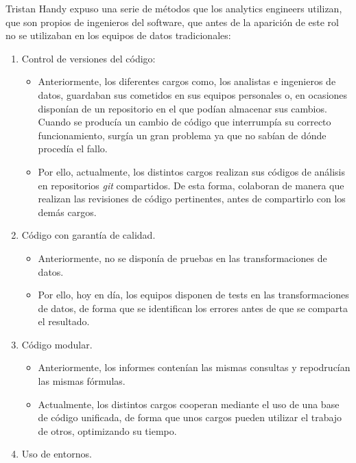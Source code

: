 Tristan Handy \cite{Analytics} expuso una serie de métodos que los analytics engineers utilizan, que son propios de ingenieros del software, que antes de la aparición de este rol no se utilizaban en los equipos de datos tradicionales:

\begin{enumerate}
	\item Control de versiones del código: 
	
	\begin{itemize}
    	\item Anteriormente, los diferentes cargos como, los analistas e ingenieros de datos, guardaban sus cometidos en sus equipos personales o, en ocasiones disponían de un repositorio en el que podían almacenar sus cambios. Cuando se producía un cambio de código que interrumpía su correcto funcionamiento, surgía un gran problema ya que no sabían de dónde procedía el fallo.
    	\item Por ello, actualmente, los distintos cargos realizan sus códigos de análisis en repositorios \emph{git} compartidos. De esta forma, colaboran de manera que realizan las revisiones de código pertinentes, antes de compartirlo con los demás cargos.
    \end{itemize}

	\item Código con garantía de calidad.
	
	\begin{itemize}
    	\item Anteriormente, no se disponía de pruebas en las transformaciones de datos.
    	\item Por ello, hoy en día, los equipos disponen de tests en las transformaciones de datos, de forma que se identifican los errores antes de que se comparta el resultado. 
    \end{itemize}
	
	\item Código modular.
	
	\begin{itemize}
    	\item Anteriormente, los informes contenían las mismas consultas y repodrucían las mismas fórmulas.
    	\item Actualmente, los distintos cargos cooperan mediante el uso de una base de código unificada, de forma que unos cargos pueden utilizar el trabajo de otros, optimizando su tiempo.
    \end{itemize}	
	
	\item Uso de entornos.


\end{enumerate}
